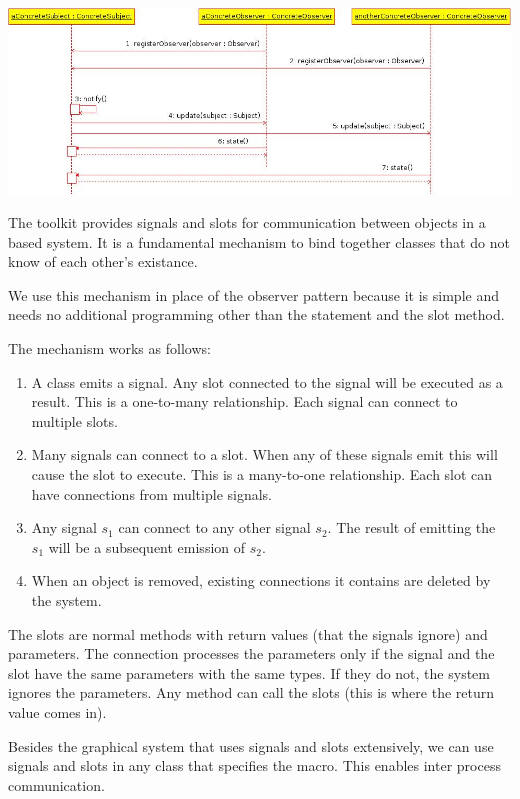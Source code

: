 \begin{center}
	\includegraphics[width=.7\linewidth]{ObserverSequenceDiagram.jpeg}
	\label{fig:observer-applied}
\end{center}

The toolkit \qt provides signals and slots for communication 
between objects in a \qt based system. It is a fundamental mechanism to bind 
together classes that do not know of each other's existance.

We use this mechanism in place of the observer pattern because it is
simple and needs no additional programming other than the  
statement and the slot method.

The mechanism works as follows:

\begin{enumerate}
	\item A class emits a signal. Any slot connected to the signal
	will be executed as a result. This is a one-to-many relationship.
	Each signal can connect to multiple slots.	
	
	\item Many signals can connect to a slot. When any of these signals 
	emit this will cause the slot to execute. This is a many-to-one relationship.
	Each slot can have connections from multiple signals.
	
	\item Any signal $s_1$ can connect to any other signal $s_2$. The result of
	emitting the $s_1$ will be a subsequent emission of $s_2$.
	
	\item When an object is removed, existing connections it contains are deleted 
	by the \qt system.
	
\end{enumerate}

The slots are normal methods with return values (that the signals ignore) and 
parameters. The connection processes the parameters only if the signal and the 
slot have the same parameters with the same types. If they do not, the system 
ignores the parameters. Any method can call the slots (this is where the return
value comes in). 

Besides the graphical system that uses signals and slots extensively, we can use
signals and slots in any class that specifies the \qobj macro. This enables
inter process communication.

